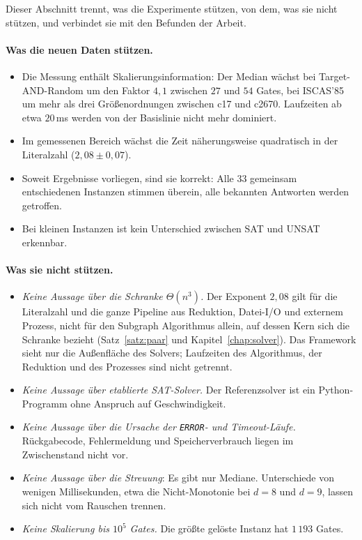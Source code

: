 Dieser Abschnitt trennt, was die Experimente stützen, von dem, was sie nicht stützen, und verbindet sie mit den Befunden der Arbeit.

\paragraph{Was die neuen Daten stützen.}
\begin{itemize}
	\item Die Messung enthält Skalierungsinformation: Der Median wächst bei Target-AND-Random um den Faktor $4{,}1$ zwischen $27$ und $54$ Gates, bei ISCAS'85 um mehr als drei Größenordnungen zwischen c17 und c2670. Laufzeiten ab etwa $20$\,ms werden von der Basislinie nicht mehr dominiert.
	\item Im gemessenen Bereich wächst die Zeit näherungsweise quadratisch in der Literalzahl ($2{,}08\pm0{,}07$).
	\item Soweit Ergebnisse vorliegen, sind sie korrekt: Alle $33$ gemeinsam entschiedenen Instanzen stimmen überein, alle bekannten Antworten werden getroffen.
	\item Bei kleinen Instanzen ist kein Unterschied zwischen SAT und UNSAT erkennbar.
\end{itemize}

\paragraph{Was sie nicht stützen.}
\begin{itemize}
	\item \emph{Keine Aussage über die Schranke $\Theta(n^3)$.} Der Exponent $2{,}08$ gilt für die Literalzahl und die ganze Pipeline aus Reduktion, Datei-I/O und externem Prozess, nicht für den Subgraph Algorithmus allein, auf dessen Kern sich die Schranke bezieht (Satz~\ref{satz:paar} und Kapitel~\ref{chap:solver}). Das Framework sieht nur die Außenfläche des Solvers; Laufzeiten des Algorithmus, der Reduktion und des Prozesses sind nicht getrennt.
	\item \emph{Keine Aussage über etablierte SAT-Solver.} Der Referenzsolver ist ein Python-Programm ohne Anspruch auf Geschwindigkeit.
	\item \emph{Keine Aussage über die Ursache der \texttt{ERROR}- und Timeout-Läufe.} Rückgabecode, Fehlermeldung und Speicherverbrauch liegen im Zwischenstand nicht vor.
	\item \emph{Keine Aussage über die Streuung}: Es gibt nur Mediane. Unterschiede von wenigen Millisekunden, etwa die Nicht-Monotonie bei $d=8$ und $d=9$, lassen sich nicht vom Rauschen trennen.
	\item \emph{Keine Skalierung bis $10^5$ Gates.} Die größte gelöste Instanz hat $1\,193$ Gates.
\end{itemize}

